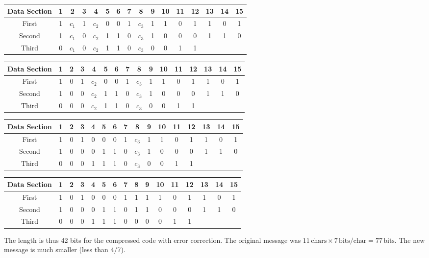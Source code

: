 {    \begin{tabular}{|c|c|c|c|c|c|c|c|c|c|c|c|c|c|c|c|}
      \hline
      Data Section & 1 & 2 & \textbf{3} & 4 & \textbf{5} & 6 & \textbf{7} & 8 & \textbf{9} & 10 & \textbf{11} & 12 & \textbf{13} & 14 & \textbf{15} \\ \hline
      First  & 1 & $c_1$ & 1 & $c_2$ & 0 & 0 & 1 & $c_3$ & 1 & 1 & 0 & 1 & 1 & 0 & 1 \\ \hline
      Second & 1 & $c_1$ & 0 & $c_2$ & 1 & 1 & 0 & $c_3$ & 1 & 0 & 0 & 0 & 1 & 1 & 0 \\ \hline
      Third  & 0 & $c_1$ & 0 & $c_2$ & 1 & 1 & 0 & $c_3$ & 0 & 0 & 1 & 1 &  &  &  \\ \hline
    \end{tabular}
    \vspace{.1in}

    \begin{tabular}{|c|c|c|c|c|c|c|c|c|c|c|c|c|c|c|c|}
      \hline
      Data Section & 1 & 2 & \textbf{3} & 4 & 5 & \textbf{6} & \textbf{7} & 8 & 9 & \textbf{10} & \textbf{11} & 12 & 13 & \textbf{14} & \textbf{15} \\ \hline
      First  & 1 & 0 & 1 & $c_2$ & 0 & 0 & 1 & $c_3$ & 1 & 1 & 0 & 1 & 1 & 0 & 1 \\ \hline
      Second & 1 & 0 & 0 & $c_2$ & 1 & 1 & 0 & $c_3$ & 1 & 0 & 0 & 0 & 1 & 1 & 0 \\ \hline
      Third  & 0 & 0 & 0 & $c_2$ & 1 & 1 & 0 & $c_3$ & 0 & 0 & 1 & 1 &  &  &  \\ \hline
    \end{tabular}
    \vspace{.1in}

    \begin{tabular}{|c|c|c|c|c|c|c|c|c|c|c|c|c|c|c|c|}
      \hline
      Data Section & 1 & 2 & 3 & 4 & \textbf{5} & \textbf{6} & \textbf{7} & 8 & 9 & 10 & 11 & \textbf{12} & \textbf{13} & \textbf{14} & \textbf{15} \\ \hline
      First  & 1 & 0 & 1 & 0 & 0 & 0 & 1 & $c_3$ & 1 & 1 & 0 & 1 & 1 & 0 & 1 \\ \hline
      Second & 1 & 0 & 0 & 0 & 1 & 1 & 0 & $c_3$ & 1 & 0 & 0 & 0 & 1 & 1 & 0 \\ \hline
      Third  & 0 & 0 & 0 & 1 & 1 & 1 & 0 & $c_3$ & 0 & 0 & 1 & 1 &  &  &  \\ \hline
    \end{tabular}
    \vspace{.1in}

    \begin{tabular}{|c|c|c|c|c|c|c|c|c|c|c|c|c|c|c|c|}
      \hline
      Data Section & 1 & 2 & 3 & 4 & 5 & 6 & 7 & 8 & \textbf{9} & \textbf{10} & \textbf{11} & \textbf{12} & \textbf{13} & \textbf{14} & \textbf{15} \\ \hline
      First  & 1 & 0 & 1 & 0 & 0 & 0 & 1 & 1 & 1 & 1 & 0 & 1 & 1 & 0 & 1 \\ \hline
      Second & 1 & 0 & 0 & 0 & 1 & 1 & 0 & 1 & 1 & 0 & 0 & 0 & 1 & 1 & 0 \\ \hline
      Third  & 0 & 0 & 0 & 1 & 1 & 1 & 0 & 0 & 0 & 0 & 1 & 1 &  &  &  \\ \hline
    \end{tabular}
    \vspace{.1in}

    The length is thus 42 bits for the compressed code with error correction.  The original message was $11\, \textrm{chars}\times 7\, \textrm{bits/char} = 77\, \textrm{bits}$.  The new message is much smaller (less than 4/7).

    } 